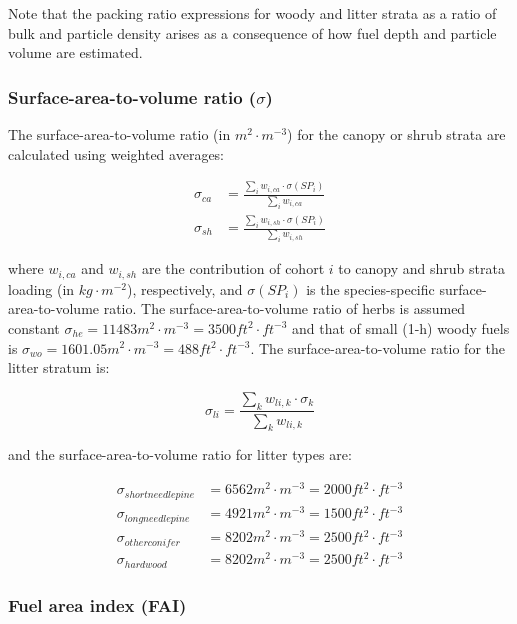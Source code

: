 \documentclass[]{book}
\begin{document}
Note that the packing ratio expressions for woody and litter strata as a
ratio of bulk and particle density arises as a consequence of how fuel
depth and particle volume are estimated.

\subsubsection{\texorpdfstring{Surface-area-to-volume ratio
(\(\sigma\))}{Surface-area-to-volume ratio (\textbackslash{}sigma)}}\label{surface-area-to-volume-ratio-sigma}

The surface-area-to-volume ratio (in \(m^2\cdot m^{-3}\)) for the canopy
or shrub strata are calculated using weighted averages:

\begin{eqnarray}
\sigma_{ca} &= \frac{\sum_{i}{w_{i,ca} \cdot \sigma(SP_i)}}{\sum_{i}{w_{i,ca}}}\\
\sigma_{sh} &= \frac{\sum_{i}{w_{i,sh} \cdot \sigma(SP_i)}}{\sum_{i}{w_{i,sh}}}
\end{eqnarray}

where \(w_{i,ca}\) and \(w_{i,sh}\) are the contribution of cohort \(i\)
to canopy and shrub strata loading (in \(kg\cdot m^{-2}\)),
respectively, and \(\sigma(SP_i)\) is the species-specific
surface-area-to-volume ratio. The surface-area-to-volume ratio of herbs
is assumed constant
\(\sigma_{he} = 11483 m^2\cdot m^{-3} = 3500 ft^2\cdot ft^{-3}\) and
that of small (1-h) woody fuels is
\(\sigma_{wo} = 1601.05 m^2\cdot m^{-3} = 488 ft^2\cdot ft^{-3}\). The
surface-area-to-volume ratio for the litter stratum is:

\begin{equation}
\sigma_{li} = \frac{\sum_{k}{w_{li,k} \cdot \sigma_{k}}}{\sum_{k}{w_{li,k}}}
\end{equation}

and the surface-area-to-volume ratio for litter types are:

\begin{eqnarray}
\sigma_{shortneedlepine} &= 6562 m^{2}\cdot m^{-3}= 2000 ft^{2}\cdot ft^{-3}\\
\sigma_{longneedlepine} &= 4921 m^{2}\cdot m^{-3}= 1500 ft^{2}\cdot ft^{-3}\\
\sigma_{otherconifer} &= 8202 m^{2}\cdot m^{-3}= 2500 ft^{2}\cdot ft^{-3}\\
\sigma_{hardwood} &= 8202 m^{2}\cdot m^{-3}= 2500 ft^{2}\cdot ft^{-3}
\end{eqnarray}

\subsubsection{Fuel area index (FAI)}\label{fuel-area-index-fai}
\end{document}
